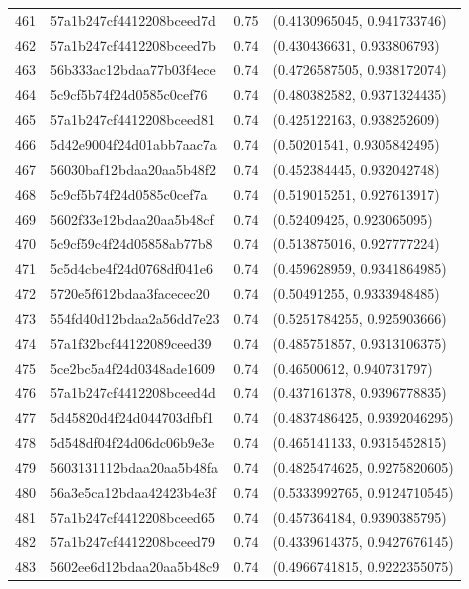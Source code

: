 \begin{table}[ht]
\begin{tabular}{rlrl}
  461 & 57a1b247cf4412208bceed7d & 0.75 & (0.4130965045, 0.941733746) \\ 
  462 & 57a1b247cf4412208bceed7b & 0.74 & (0.430436631, 0.933806793) \\ 
  463 & 56b333ac12bdaa77b03f4ece & 0.74 & (0.4726587505, 0.938172074) \\ 
  464 & 5c9cf5b74f24d0585c0cef76 & 0.74 & (0.480382582, 0.9371324435) \\ 
  465 & 57a1b247cf4412208bceed81 & 0.74 & (0.425122163, 0.938252609) \\ 
  466 & 5d42e9004f24d01abb7aac7a & 0.74 & (0.50201541, 0.9305842495) \\ 
  467 & 56030baf12bdaa20aa5b48f2 & 0.74 & (0.452384445, 0.932042748) \\ 
  468 & 5c9cf5b74f24d0585c0cef7a & 0.74 & (0.519015251, 0.927613917) \\ 
  469 & 5602f33e12bdaa20aa5b48cf & 0.74 & (0.52409425, 0.923065095) \\ 
  470 & 5c9cf59c4f24d05858ab77b8 & 0.74 & (0.513875016, 0.927777224) \\ 
  471 & 5c5d4cbe4f24d0768df041e6 & 0.74 & (0.459628959, 0.9341864985) \\ 
  472 & 5720e5f612bdaa3facecec20 & 0.74 & (0.50491255, 0.9333948485) \\ 
  473 & 554fd40d12bdaa2a56dd7e23 & 0.74 & (0.5251784255, 0.925903666) \\ 
  474 & 57a1f32bcf44122089ceed39 & 0.74 & (0.485751857, 0.9313106375) \\ 
  475 & 5ce2bc5a4f24d0348ade1609 & 0.74 & (0.46500612, 0.940731797) \\ 
  476 & 57a1b247cf4412208bceed4d & 0.74 & (0.437161378, 0.9396778835) \\ 
  477 & 5d45820d4f24d044703dfbf1 & 0.74 & (0.4837486425, 0.9392046295) \\ 
  478 & 5d548df04f24d06dc06b9e3e & 0.74 & (0.465141133, 0.9315452815) \\ 
  479 & 5603131112bdaa20aa5b48fa & 0.74 & (0.4825474625, 0.9275820605) \\ 
  480 & 56a3e5ca12bdaa42423b4e3f & 0.74 & (0.5333992765, 0.9124710545) \\ 
  481 & 57a1b247cf4412208bceed65 & 0.74 & (0.457364184, 0.9390385795) \\ 
  482 & 57a1b247cf4412208bceed79 & 0.74 & (0.4339614375, 0.9427676145) \\ 
  483 & 5602ee6d12bdaa20aa5b48c9 & 0.74 & (0.4966741815, 0.9222355075) \\ 

\end{tabular}
\end{table}
